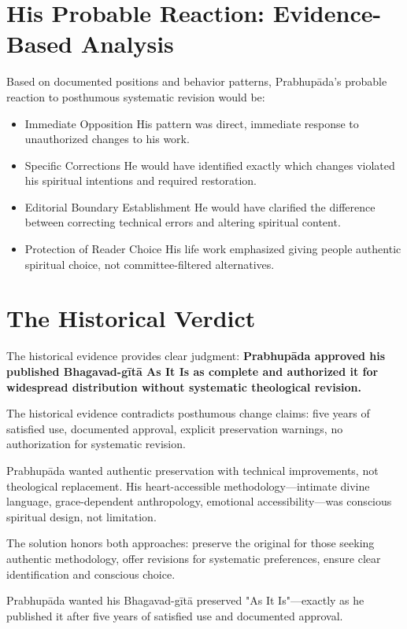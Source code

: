 \documentclass[11pt,twoside]{book}
\begin{document}
\section*{His Probable Reaction: Evidence-Based Analysis}
\label{sec:org8f90692}

Based on documented positions and behavior patterns, Prabhupāda's probable reaction to posthumous systematic revision would be:
\begin{itemize}
\item Immediate Opposition
\label{sec:org6dbe092}
His pattern was direct, immediate response to unauthorized changes to his work.
\item Specific Corrections
\label{sec:orgf502f0e}
He would have identified exactly which changes violated his spiritual intentions and required restoration.
\item Editorial Boundary Establishment
\label{sec:orgad32ebb}
He would have clarified the difference between correcting technical errors and altering spiritual content.
\item Protection of Reader Choice
\label{sec:orga3be346}
His life work emphasized giving people authentic spiritual choice, not committee-filtered alternatives.
\end{itemize}
\section*{The Historical Verdict}
\label{sec:orgacac346}

The historical evidence provides clear judgment: \textbf{\textbf{Prabhupāda approved his published Bhagavad-gītā As It Is as complete and authorized it for widespread distribution without systematic theological revision.}}

The historical evidence contradicts posthumous change claims: five years of satisfied use, documented approval, explicit preservation warnings, no authorization for systematic revision.

Prabhupāda wanted authentic preservation with technical improvements, not theological replacement. His heart-accessible methodology—intimate divine language, grace-dependent anthropology, emotional accessibility—was conscious spiritual design, not limitation.

The solution honors both approaches: preserve the original for those seeking authentic methodology, offer revisions for systematic preferences, ensure clear identification and conscious choice.

Prabhupāda wanted his Bhagavad-gītā preserved "As It Is"—exactly as he published it after five years of satisfied use and documented approval.
\end{document}
